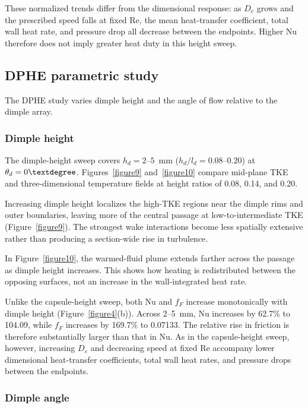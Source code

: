 \documentclass[energies,article,submit,moreauthors,noheaderline]{Definitions/mdpi}
\newcommand{\degree}{\texorpdfstring{\ensuremath{^\circ}}{\textdegree}}
\def\ensuremath#1{}%
\def\degree{\textdegree}%
\begin{document}
These normalized trends differ from the dimensional response: as $D_e$ grows and the prescribed speed falls at fixed Re, the mean heat-transfer coefficient, total wall heat rate, and pressure drop all decrease between the endpoints. Higher Nu therefore does not imply greater heat duty in this height sweep.

\subsection{DPHE parametric study}
\label{sec:dphe_results}

The DPHE study varies dimple height and the angle of flow relative to the dimple array.

\subsubsection{Dimple height}
\label{sec:disc_dimple_height}

The dimple-height sweep covers $h_d=2$--$5$~mm ($h_d/l_d=0.08$--$0.20$) at $\theta_d=0\degree$. Figures~\ref{figure9} and~\ref{figure10} compare mid-plane TKE and three-dimensional temperature fields at height ratios of 0.08, 0.14, and 0.20.



Increasing dimple height localizes the high-TKE regions near the dimple rims and outer boundaries, leaving more of the central passage at low-to-intermediate TKE (Figure~\ref{figure9}). The strongest wake interactions become less spatially extensive rather than producing a section-wide rise in turbulence.



In Figure~\ref{figure10}, the warmed-fluid plume extends farther across the passage as dimple height increases. This shows how heating is redistributed between the opposing surfaces, not an increase in the wall-integrated heat rate.

Unlike the capsule-height sweep, both Nu and $f_F$ increase monotonically with dimple height (Figure~\ref{figure4}(b)). Across 2--5~mm, Nu increases by 62.7\% to 104.09, while $f_F$ increases by 169.7\% to 0.07133. The relative rise in friction is therefore substantially larger than that in Nu. As in the capsule-height sweep, however, increasing $D_e$ and decreasing speed at fixed Re accompany lower dimensional heat-transfer coefficients, total wall heat rates, and pressure drops between the endpoints.

\subsubsection{Dimple angle}
\label{sec:disc_dimple_angle}
\end{document}
